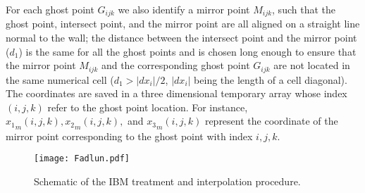 \documentclass[review]{elsarticle}
\begin{document}
For each ghost point $G_{ijk}$ we also identify a mirror point $M_{ijk}$, such that the ghost point, intersect point, and the mirror point are all aligned on a straight line normal to the wall; the distance between the intersect point and the mirror point ($d_1$) is the same for all the ghost points and is chosen long enough to ensure that the mirror point $M_{ijk}$ and the corresponding ghost point $G_{ijk}$ are not located in the same numerical cell ($d_1>\lvert dx_i \lvert/2$, $\lvert dx_i \lvert$ being the length of a cell diagonal). The coordinates are saved in a three dimensional temporary array whose index $(i,j,k)$ refer to the ghost point location. For instance, ${x_1}_{m}(i,j,k), {x_2}_{m}(i,j,k),$ and ${x_3}_{m}(i,j,k)$ represent the coordinate of the mirror point corresponding to the ghost point with index $i,j,k$.
\begin{figure} [H]
\begin{center}
 \texttt{[image: Fadlun.pdf]}
\caption{Schematic of the IBM treatment and interpolation procedure.}
\label{fig:IBM}
 \end{center}
 \end{figure}
\end{document}
